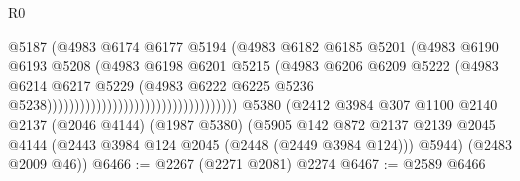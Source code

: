 \begin{lexlean}{R0}
\begin{coremodule}
                                                            @5187
                                                            (@4983
                                                              @6174
                                                              @6177
                                                              @5194
                                                              (@4983
                                                                @6182
                                                                @6185
                                                                @5201
                                                                (@4983
                                                                  @6190
                                                                  @6193
                                                                  @5208
                                                                  (@4983
                                                                    @6198
                                                                    @6201
                                                                    @5215
                                                                    (@4983
                                                                      @6206
                                                                      @6209
                                                                      @5222
                                                                      (@4983
                                                                        @6214
                                                                        @6217
                                                                        @5229
                                                                        (@4983
                                                                          @6222
                                                                          @6225
                                                                          @5236
                                                                          @5238)))))))))))))))))))))))))))))))))))
    @5380
    (@2412
      @3984
      @307
      @1100
      @2140
      @2137
      (@2046 @4144)
      (@1987 @5380)
      (@5905
        @142
        @872
        @2137
        @2139
        @2045
        @4144
        (@2443 @3984 @124 @2045 (@2448 (@2449 @3984 @124)))
        @5944)
      (@2483 @2009 @46))
@6466 := @2267 (@2271 @2081) @2274
@6467 := @2589 @6466

\end{coremodule}
\end{lexlean}
